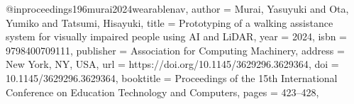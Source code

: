 @inproceedings{196murai2024wearablenav,
author = {Murai, Yasuyuki and Ota, Yumiko and Tatsumi, Hisayuki},
title = {Prototyping of a walking assistance system for visually impaired people using AI and LiDAR},
year = {2024},
isbn = {9798400709111},
publisher = {Association for Computing Machinery},
address = {New York, NY, USA},
url = {https://doi.org/10.1145/3629296.3629364},
doi = {10.1145/3629296.3629364},
booktitle = {Proceedings of the 15th International Conference on Education Technology and Computers},
pages = {423–428},
}